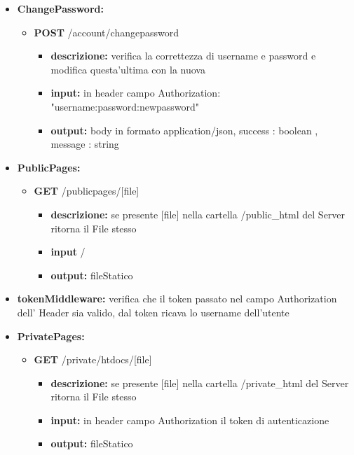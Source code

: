 {{\begin{itemize}
		\item \textbf{ChangePassword:}
			\begin{itemize}
			\item  \textbf{POST} /account/changepassword 
				\begin{itemize} 
				\item \textbf{descrizione:} verifica la correttezza di username e password e modifica questa'ultima con la nuova 
				\item \textbf{input:} in header campo Authorization: "username:password:newpassword"
				\item \textbf{output:} body in formato application/json, success : boolean  , message : string
				\end{itemize}
			\end{itemize}
			
		\item \textbf{PublicPages:}
			\begin{itemize}
			\item  \textbf{GET} /publicpages/[file] 
				\begin{itemize} 
				\item \textbf{descrizione:} se presente [file] nella cartella /public\_html del Server\ped{g} ritorna il File stesso 
				\item \textbf{input} /
				\item \textbf{output:} fileStatico
				\end{itemize}
			\end{itemize}
			
		\item \textbf{tokenMiddleware:} verifica che il token passato nel campo Authorization dell' Header sia valido, dal token ricava lo username dell'utente
		
		\item \textbf{PrivatePages:}
			\begin{itemize}
			\item  \textbf{GET} /private/htdocs/[file] 
				\begin{itemize} 
				\item \textbf{descrizione:} se presente [file] nella cartella /private\_html del Server ritorna il File stesso
				\item \textbf{input:} in header campo Authorization il token di autenticazione
				\item \textbf{output:} fileStatico
				\end{itemize}
			\end{itemize}
			

\end{itemize}}}
